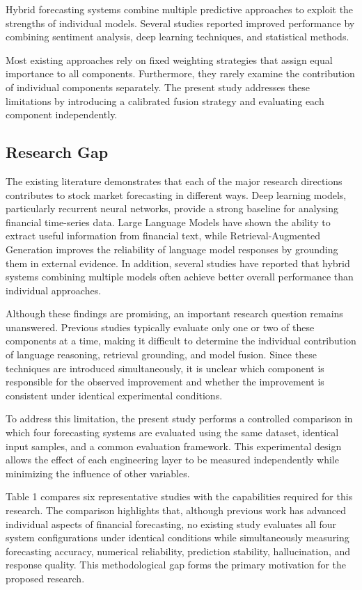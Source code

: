 Hybrid forecasting systems combine multiple predictive approaches to
exploit the strengths of individual models. Several studies reported
improved performance by combining sentiment analysis, deep learning
techniques, and statistical methods.

Most existing approaches rely on fixed weighting strategies that assign
equal importance to all components. Furthermore, they rarely examine the
contribution of individual components separately. The present study
addresses these limitations by introducing a calibrated fusion strategy
and evaluating each component independently.

\subsection{Research Gap}\label{sec:research-gap}

The existing literature demonstrates that each of the major research
directions contributes to stock market forecasting in different ways.
Deep learning models, particularly recurrent neural networks, provide a
strong baseline for analysing financial time-series data. Large Language
Models have shown the ability to extract useful information from
financial text, while Retrieval-Augmented Generation improves the
reliability of language model responses by grounding them in external
evidence. In addition, several studies have reported that hybrid systems
combining multiple models often achieve better overall performance than
individual approaches.

Although these findings are promising, an important research question
remains unanswered. Previous studies typically evaluate only one or two
of these components at a time, making it difficult to determine the
individual contribution of language reasoning, retrieval grounding, and
model fusion. Since these techniques are introduced simultaneously, it
is unclear which component is responsible for the observed improvement
and whether the improvement is consistent under identical experimental
conditions.

To address this limitation, the present study performs a controlled
comparison in which four forecasting systems are evaluated using the
same dataset, identical input samples, and a common evaluation
framework. This experimental design allows the effect of each
engineering layer to be measured independently while minimizing the
influence of other variables.

Table 1 compares six representative studies with the capabilities
required for this research. The comparison highlights that, although
previous work has advanced individual aspects of financial forecasting,
no existing study evaluates all four system configurations under
identical conditions while simultaneously measuring forecasting
accuracy, numerical reliability, prediction stability, hallucination,
and response quality. This methodological gap forms the primary
motivation for the proposed research.

